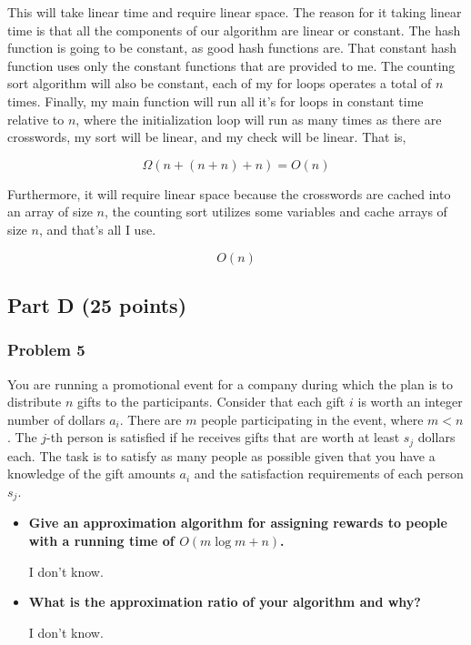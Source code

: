 \documentclass[11pt]{article}
\begin{document}
This will take linear time and require linear space. The reason for it taking
linear time is that all the components of our algorithm are linear or constant.
The hash function is going to be constant, as good hash functions are. That
constant hash function uses only the constant functions that are provided to me.
The counting sort algorithm will also be constant, each of my for loops operates
a total of $n$ times. Finally, my main function will run all it's for loops
in constant time relative to $n$, where the initialization loop will run as many
times as there are crosswords, my sort will be linear, and my check will be linear.
That is,

$$\Omega(n + (n + n) + n) = O(n)$$

Furthermore, it will require linear space because the crosswords are cached
into an array of size $n$, the counting sort utilizes some variables and
cache arrays of size $n$, and that's all I use.

$$O(n)$$

\subsection*{Part D (25 points)}

\subsubsection*{Problem 5} 

You are running a promotional event for a
company during which the plan is to distribute $n$ gifts to the
participants. Consider that each gift $i$ is worth an integer number
of dollars $a_i$. There are $m$ people participating in the event,
where $m < n$. The $j$-th person is satisfied if he receives gifts
that are worth at least $s_j$ dollars each. The task is to satisfy as
many people as possible given that you have a knowledge of the gift
amounts $a_i$ and the satisfaction requirements of each person
$s_j$. 

\begin{itemize}
\item \textbf{Give an approximation algorithm for assigning rewards to people
with a running time of $O(m\log m+n)$.} 

I don't know.

\item \textbf{What is the approximation ratio of your algorithm and why?}

I don't know.

\end{itemize}
\end{document}
